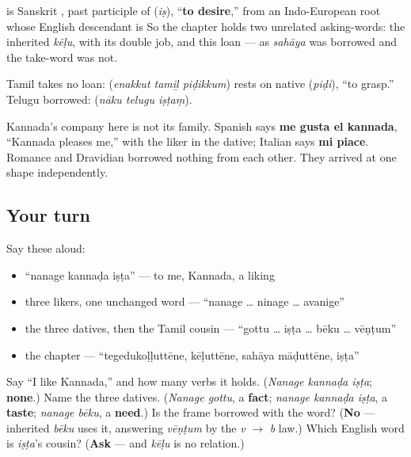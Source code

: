 \begin{cousinweb}
\textbf{} is Sanskrit \textbf{}, past participle of \textbf{} (\emph{iṣ}), \textquotedblleft{}\textbf{to desire},\textquotedblright{} from an Indo-European root whose English descendant is So the chapter holds two unrelated asking-words: the inherited \emph{kēḷu}, with its double job, and this loan — as \emph{sahāya} was borrowed and the take-word was not.

Tamil takes no loan: \textbf{  } (\emph{enakkut tamiḻ piḍikkum}) rests on native \textbf{} (\emph{piḍi}), \textquotedblleft{}to grasp.\textquotedblright{} Telugu borrowed: \textbf{  } (\emph{nāku telugu iṣṭaṃ}).

Kannada's company here is not its family. Spanish says \textbf{me gusta el kannada}, \textquotedblleft{}Kannada pleases me,\textquotedblright{} with the liker in the dative; Italian says \textbf{mi piace}. Romance and Dravidian borrowed nothing from each other. They arrived at one shape independently.
\end{cousinweb}

\subsection*{Your turn}
Say these aloud:

\begin{itemize}
\raggedright
  \item \textquotedblleft{}nanage kannaḍa iṣṭa\textquotedblright{} — to me, Kannada, a liking
  \item three likers, one unchanged word — \textquotedblleft{}nanage … ninage … avanige\textquotedblright{}
  \item the three datives, then the Tamil cousin — \textquotedblleft{}gottu … iṣṭa … bēku … vēṇṭum\textquotedblright{}
  \item the chapter — \textquotedblleft{}tegedukoḷḷuttēne, kēḷuttēne, sahāya māḍuttēne, iṣṭa\textquotedblright{}
\end{itemize}

\begin{tcolorbox}[breakable,colback=teal!4,colframe=teal!35!black,title={Before you move on}]
Say \textquotedblleft{}I like Kannada,\textquotedblright{} and how many verbs it holds. (\emph{Nanage kannaḍa iṣṭa}; \textbf{none}.) Name the three datives. (\emph{Nanage gottu}, a \textbf{fact}; \emph{nanage kannaḍa iṣṭa}, a \textbf{taste}; \emph{nanage bēku}, a \textbf{need}.) Is the frame borrowed with the word? (\textbf{No} — inherited \emph{bēku} uses it, answering \emph{vēṇṭum} by the \emph{v} $\to$ \emph{b} law.) Which English word is \emph{iṣṭa}'s cousin? (\textbf{Ask} — and \emph{kēḷu} is no relation.)
\end{tcolorbox}
